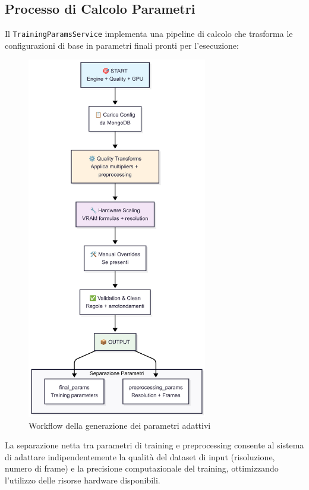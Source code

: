 \subsection{Processo di Calcolo Parametri}

Il \texttt{TrainingParamsService} implementa una pipeline di calcolo che trasforma le configurazioni di base in parametri finali pronti per l'esecuzione:

\begin{figure}[htbp]
	\centering
	\includegraphics[width=0.7\textwidth]{images/training_params_service_workflow.jpg}
	\caption{Workflow della generazione dei parametri adattivi}
	\label{fig:training_params_service_workflow}
\end{figure}

La separazione netta tra parametri di training e preprocessing consente al sistema di adattare indipendentemente la qualità del dataset di input (risoluzione, numero di frame) e la precisione computazionale del training, ottimizzando l'utilizzo delle risorse hardware disponibili.

